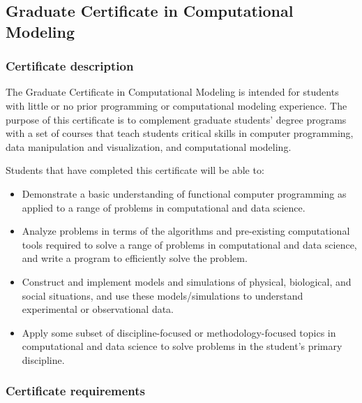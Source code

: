 \subsection{Graduate Certificate in Computational Modeling}
\label{sec:cert_model}

\subsubsection{Certificate description}

The Graduate Certificate in Computational Modeling is intended for
students with little or no prior programming or computational modeling
experience. The purpose of this certificate is to complement graduate
students' degree programs with a set of courses that teach students
critical skills in computer programming, data manipulation and
visualization, and computational modeling.  

\vspace{2mm}

\noindent
Students that have completed this certificate will be able to: 

\begin{itemize} 
\item  Demonstrate a basic understanding of functional computer
  programming as applied to a range of problems in computational and
  data science.  

\item  Analyze problems in terms of the algorithms and pre-existing
  computational tools required to solve a range of problems in
  computational and data science, and write a program to efficiently
  solve the problem.  

\item  Construct and implement models and simulations of physical,
  biological, and social situations, and use these models/simulations
  to understand experimental or observational data.  

\item  Apply some subset of discipline-focused or methodology-focused
topics in computational and data science to solve problems in the
student's primary discipline.

\end{itemize}

\subsubsection{Certificate requirements}

